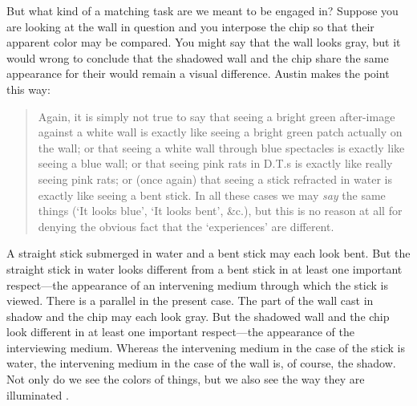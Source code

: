 \documentclass[12pt]{article}
\begin{document}
But what kind of a matching task are we meant to be engaged in? Suppose you are looking at the wall in question and you interpose the chip so that their apparent color may be compared. You might say that the wall looks gray, but it would wrong to conclude that the shadowed wall and the chip share the same appearance for their would remain a visual difference. Austin makes the point this way:
	\begin{quote}
		Again, it is simply not true to say that seeing a bright green after-image against a white wall is exactly like seeing a bright green patch actually on the wall; or that seeing a white wall through blue spectacles is exactly like seeing a blue wall; or that seeing pink rats in D.T.s is exactly like really seeing pink rats; or (once again) that seeing a stick refracted in water is exactly like seeing a bent stick. In all these cases we may \emph{say} the same things (`It looks blue', `It looks bent', \&c.), but this is no reason at all for denying the obvious fact that the `experiences' are different. \citep[49]{Austin:1962lr}
	\end{quote}

A straight stick submerged in water and a bent stick may each look bent. But the straight stick in water looks different from a bent stick in at least one important respect---the appearance of an intervening medium through which the stick is viewed. There is a parallel in the present case. The part of the wall cast in shadow and the chip may each look gray. But the shadowed wall and the chip look different in at least one important respect---the appearance of the interviewing medium. Whereas the intervening medium in the case of the stick is water, the intervening medium in the case of the wall is, of course, the shadow. Not only do we see the colors of things, but we also see the way they are illuminated \citep[see][]{Hilbert:2007qy}.
\end{document}
